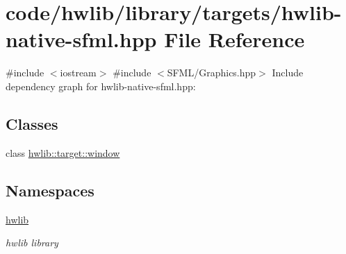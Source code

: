 \hypertarget{hwlib-native-sfml_8hpp}{}\section{code/hwlib/library/targets/hwlib-\/native-\/sfml.hpp File Reference}
\label{hwlib-native-sfml_8hpp}
{\ttfamily \#include $<$iostream$>$}\newline
{\ttfamily \#include $<$S\+F\+M\+L/\+Graphics.\+hpp$>$}\newline
Include dependency graph for hwlib-\/native-\/sfml.hpp\+:
\subsection*{Classes}
\begin{DoxyCompactItemize}
\item 
class \hyperlink{classhwlib_1_1target_1_1window}{hwlib\+::target\+::window}
\end{DoxyCompactItemize}
\subsection*{Namespaces}
\begin{DoxyCompactItemize}
\item 
 \hyperlink{namespacehwlib}{hwlib}
\begin{DoxyCompactList}\small\item\em hwlib library \end{DoxyCompactList}\end{DoxyCompactItemize}

